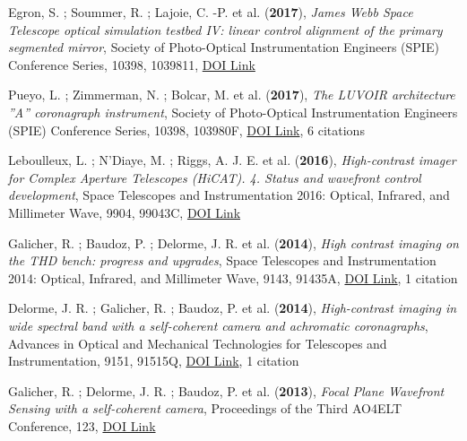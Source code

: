 \documentclass[11pt]{article}
\begin{document}
\begin{etaremune}
 \item Egron, S. ; Soummer, R. ; Lajoie, C. -P. et al. ({\bf2017}), {\it James Webb Space Telescope optical simulation testbed IV: linear control alignment of the primary segmented mirror}, Society of Photo-Optical Instrumentation Engineers (SPIE) Conference Series, 10398, 1039811, \href{https://doi.org/10.1117/12.2272981}{DOI Link}

 \item Pueyo, L. ; Zimmerman, N. ; Bolcar, M. et al. ({\bf2017}), {\it The LUVOIR architecture ''A'' coronagraph instrument}, Society of Photo-Optical Instrumentation Engineers (SPIE) Conference Series, 10398, 103980F, \href{https://doi.org/10.1117/12.2274654}{DOI Link}, 6 citations

 \item Leboulleux, L. ; N'Diaye, M. ; Riggs, A. J. E. et al. ({\bf2016}), {\it High-contrast imager for Complex Aperture Telescopes (HiCAT). 4. Status and wavefront control development}, Space Telescopes and Instrumentation 2016: Optical, Infrared, and Millimeter Wave, 9904, 99043C, \href{https://doi.org/10.1117/12.2233640}{DOI Link}

 \item Galicher, R. ; Baudoz, P. ; Delorme, J. R. et al. ({\bf2014}), {\it High contrast imaging on the THD bench: progress and upgrades}, Space Telescopes and Instrumentation 2014: Optical, Infrared, and Millimeter Wave, 9143, 91435A, \href{https://doi.org/10.1117/12.2055902}{DOI Link}, 1 citation

 \item Delorme, J. R. ; Galicher, R. ; Baudoz, P. et al. ({\bf2014}), {\it High-contrast imaging in wide spectral band with a self-coherent camera and achromatic coronagraphs}, Advances in Optical and Mechanical Technologies for Telescopes and Instrumentation, 9151, 91515Q, \href{https://doi.org/10.1117/12.2056846}{DOI Link}, 1 citation

 \item Galicher, R. ; Delorme, J. R. ; Baudoz, P. et al. ({\bf2013}), {\it Focal Plane Wavefront Sensing with a self-coherent camera}, Proceedings of the Third AO4ELT Conference, 123, \href{https://doi.org/10.12839/AO4ELT3.18647}{DOI Link}

 \end{etaremune}
\end{document}
